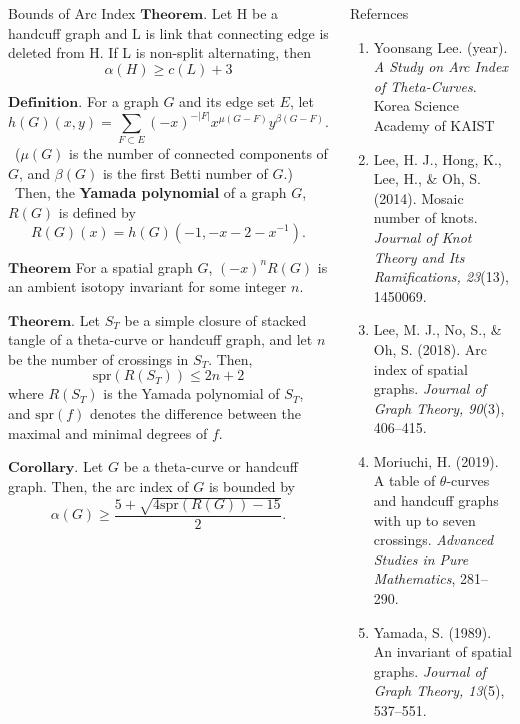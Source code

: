 \documentclass[final]{beamer}
\begin{document}
\begin{frame}[t]
\begin{columns}[t]
\begin{block}{Bounds of Arc Index}
  $\mathbf{Theorem.}$ Let H be a handcuff graph and L is link that connecting edge is deleted from H. If L is non-split alternating, then 
  \begin{equation*}
    \alpha(H) \geq c(L) + 3
  \end{equation*}

    $\mathbf{Definition.}$ For a graph $G$ and its edge set $E$, let
    \[ h(G)(x, y) = \sum_{F \subset E} (-x)^{-|F|} x^{\mu(G-F)} y^{\beta(G-F)}. \]
    \ ($\mu(G)$ is the number of connected components of $G$, and $\beta(G)$ is the first Betti number of $G$.) \\
    \ Then, the \textbf{Yamada polynomial} of a graph $G$, $R(G)$ is defined by
    \[ R(G)(x) = h(G)(-1, -x-2-x^{-1}). \]

    \vspace{1em}

    $\mathbf{Theorem}$ For a spatial graph $G$, $(-x)^n R(G)$ is an ambient isotopy invariant for some integer $n$.

    \vspace{1em}
    
    $\mathbf{Theorem.}$ Let $S_T$ be a simple closure of stacked tangle of a theta-curve or handcuff graph, and let $n$ be the number of crossings in $S_T$. Then,
     \[ \mathrm{spr}(R(S_T)) \leq 2n+2 \]
     where $R(S_T)$ is the Yamada polynomial of $S_T$, and $\mathrm{spr}(f)$ denotes the difference between the maximal and minimal degrees of $f$. \\

    \vspace{1em}

    $\mathbf{Corollary.}$  Let $G$ be a theta-curve or handcuff graph. Then, the arc index of $G$ is bounded by
      \[ \alpha(G) \geq \frac{5 + \sqrt{4 \mathrm{spr}(R(G)) - 15}}{2}. \]
  \end{block}
  \begin{block}{Refernces}
    \begin{enumerate}
      \item Yoonsang Lee. (year). \textit{A Study on Arc Index of Theta-Curves}. Korea Science Academy of KAIST
      \item Lee, H. J., Hong, K., Lee, H., \& Oh, S. (2014). Mosaic number of knots. \textit{Journal of Knot Theory and Its Ramifications, 23}(13), 1450069.
      \item Lee, M. J., No, S., \& Oh, S. (2018). Arc index of spatial graphs. \textit{Journal of Graph Theory, 90}(3), 406–415.
      \item Moriuchi, H. (2019). A table of $\theta$-curves and handcuff graphs with up to seven crossings. \textit{Advanced Studies in Pure Mathematics}, 281–290.
      \item Yamada, S. (1989). An invariant of spatial graphs. \textit{Journal of Graph Theory, 13}(5), 537–551.
      
    \end{enumerate}
  \end{block}

\end{columns}

\end{frame}
\end{document}
